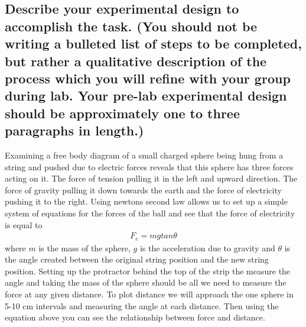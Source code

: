 \documentclass{article}
\begin{document}
\subsection*{Describe your experimental design to accomplish the task. (You should not be writing a bulleted list of steps to be completed, but rather a qualitative description of the process which you will refine with your group during lab. Your pre-lab experimental design should be approximately one to three paragraphs in length.)}

    Examining a free body diagram of a small charged sphere being hung from a string and pushed due to electric forces reveals that this sphere has three forces acting on it. The force of tension pulling it in the left and upward direction. The force of gravity pulling it down towards the earth and the force of electricity pushing it to the right. Using newtons second law allows us to set up a simple system of equations for the forces of the ball and see that the force of electricity is equal to 
    \begin{align*}
        F_e = mgtan\theta
    \end{align*}
    where $m$ is the mass of the sphere, $g$ is the acceleration due to gravity and $\theta$ is the angle created between the original string position and the new string position. Setting up the protractor behind the top of the strip the measure the angle and taking the mass of the sphere should be all we need to measure the force at any given distance. To plot distance we will approach the one sphere in 5-10 cm intervals and measuring the angle at each distance. Then using the equation above you can see the relationship between force and distance. 
\end{document}
